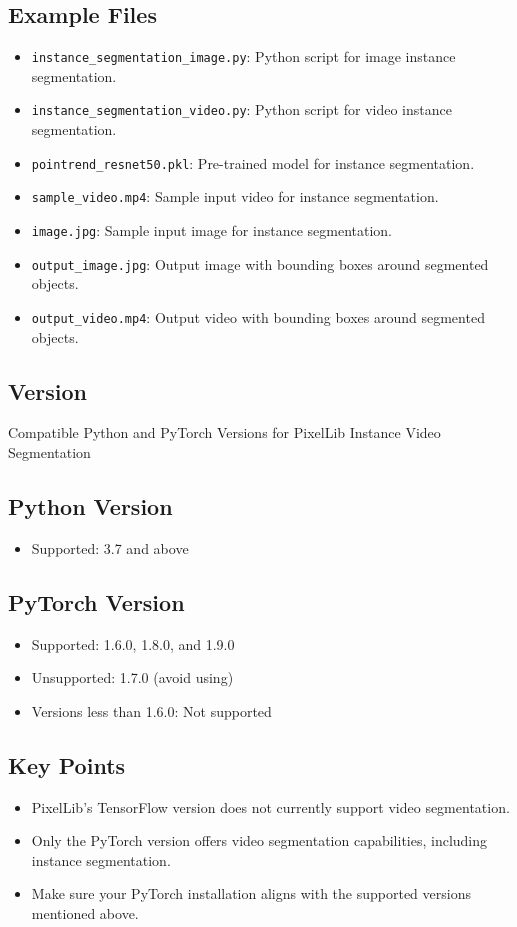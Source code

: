 \subsection{Example Files}
\begin{itemize}
    \item \texttt{instance\_segmentation\_image.py}: Python script for image instance segmentation.
    \item \texttt{instance\_segmentation\_video.py}: Python script for video instance segmentation.
    \item \texttt{pointrend\_resnet50.pkl}: Pre-trained model for instance segmentation.
    \item \texttt{sample\_video.mp4}: Sample input video for instance segmentation.
    \item \texttt{image.jpg}: Sample input image for instance segmentation.
    \item \texttt{output\_image.jpg}: Output image with bounding boxes around segmented objects.
    \item \texttt{output\_video.mp4}: Output video with bounding boxes around segmented objects.
\end{itemize}

\subsection{Version}
Compatible Python and PyTorch Versions for PixelLib Instance Video Segmentation

\subsection*{Python Version}
\begin{itemize}[label=--]
    \item Supported: 3.7 and above
\end{itemize}

\subsection*{PyTorch Version}
\begin{itemize}[label=--]
    \item Supported: 1.6.0, 1.8.0, and 1.9.0
    \item Unsupported: 1.7.0 (avoid using)
    \item Versions less than 1.6.0: Not supported
\end{itemize}

\subsection*{Key Points}
\begin{itemize}[label=--]
    \item PixelLib's TensorFlow version does not currently support video segmentation.
    \item Only the PyTorch version offers video segmentation capabilities, including instance segmentation.
    \item Make sure your PyTorch installation aligns with the supported versions mentioned above.
\end{itemize}

